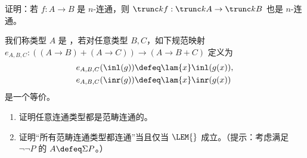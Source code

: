 \begin{ex}\label{ex:is-conn-trunc-functor}
  证明：若 $f : A \to B$ 是 $n$-连通，则 $\trunc kf : \trunc kA \to \trunc kB$ 也是 $n$-连通。
\end{ex}

\begin{ex}\label{ex:categorical-connectedness}
  我们称类型 $A$ 是
  ，若对任意类型 $B,C$，如下规范映射
  $e_{A, B, C}:((A\to B) + (A\to C)) \to (A \to B + C)$ 定义为
  \begin{align*}
    e_{A,B,C}(\inl(g)) &\defeq \lam{x} \inl(g(x)),\\
    e_{A,B,C}(\inr(g)) &\defeq \lam{x} \inr(g(x))
  \end{align*}
  是一个等价。
  \begin{enumerate}
  \item 证明任意连通类型都是范畴连通的。
  \item 证明“所有范畴连通类型都连通”当且仅当 $\LEM{}$ 成立。（提示：考虑满足 $\neg \neg P$ 的 $A \defeq \Sigma P$。）
  \end{enumerate}
\end{ex}

